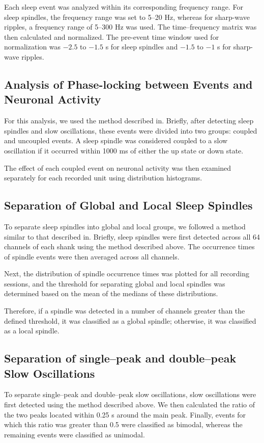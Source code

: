 \documentclass[12pt]{report}
\begin{document}
	Each sleep event was analyzed within its corresponding frequency range. For sleep spindles, the frequency range was set to 5--20 Hz, whereas for sharp-wave ripples, a frequency range of 5--300 Hz was used. The time–frequency matrix was then calculated and normalized. The pre-event time window used for normalization was $-2.5$ to $-1.5$ s for sleep spindles and $-1.5$ to $-1$ s for sharp-wave ripples.
	
	\subsection{Analysis of Phase-locking between Events and Neuronal Activity}
	\label{Analysis of Phase-locking between Events and Neuronal Activity}
	For this analysis, we used the method described in\cite{Dickey2021}. Briefly, after detecting sleep spindles and slow oscillations, these events were divided into two groups: coupled and uncoupled events. A sleep spindle was considered coupled to a slow oscillation if it occurred within 1000 ms of either the up state or down state.
	
	The effect of each coupled event on neuronal activity was then examined separately for each recorded unit using distribution histograms.
	
	\subsection{Separation of Global and Local Sleep Spindles}
	\label{Separation of Global and Local Sleep Spindles}
	To separate sleep spindles into global and local groups, we followed a method similar to that described in\cite{Nir2011}. Briefly, sleep spindles were first detected across all 64 channels of each shank using the method described above. The occurrence times of spindle events were then averaged across all channels.
	
	Next, the distribution of spindle occurrence times was plotted for all recording sessions, and the threshold for separating global and local spindles was determined based on the mean of the medians of these distributions.
	
	Therefore, if a spindle was detected in a number of channels greater than the defined threshold, it was classified as a global spindle; otherwise, it was classified as a local spindle.
	\subsection{Separation of single--peak and double--peak Slow Oscillations} 
	\label{Separation of Bimodal and Unimodal Slow Oscillations}
	To separate single--peak and double--peak slow oscillations, slow oscillations were first detected using the method described above. We then calculated the ratio of the two peaks located within 0.25 s around the main peak. Finally, events for which this ratio was greater than 0.5 were classified as bimodal, whereas the remaining events were classified as unimodal.
	
\end{document}

